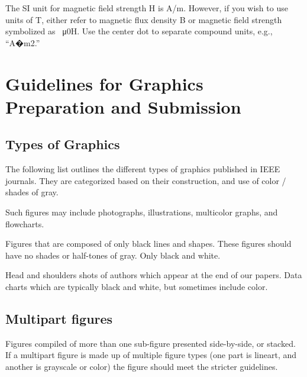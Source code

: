 \documentclass[journal]{IEEEtranTIE}
\begin{document}
The SI unit for magnetic field strength H is A/m. However, if you wish to use units of T, either refer to magnetic flux density B or magnetic field strength symbolized as \SI{}{\micro0H}. Use the center dot to separate compound units, e.g., ``A�m2.''

\section{Guidelines for Graphics Preparation and Submission}

\subsection{Types of Graphics}
The following list outlines the different types of graphics published in IEEE journals. They are categorized based on their construction, and use of color / shades of gray.

Such figures may include photographs, illustrations, multicolor graphs, and flowcharts.

Figures that are composed of only black lines and shapes. These figures should have no shades or half-tones of gray. Only black and white.

Head and shoulders shots of authors which appear at the end of our papers.  Data charts which are typically black and white, but sometimes include color.

\subsection{Multipart figures}

Figures compiled of more than one sub-figure presented side-by-side, or stacked. If a multipart figure is made up of multiple figure types (one part is lineart, and another is grayscale or color) the figure should meet the stricter guidelines.
\end{document}
